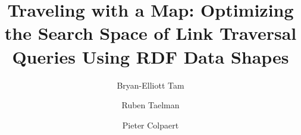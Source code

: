 \documentclass[runningheads]{llncs}
\begin{document}
%
\title{Traveling with a Map: Optimizing the Search Space of Link Traversal Queries Using RDF Data Shapes}
%
%
\author{Bryan-Elliott Tam \and
Ruben Taelman \and
Pieter Colpaert}
%
%
%
\maketitle              %
%








\printbibliography
\end{document}

